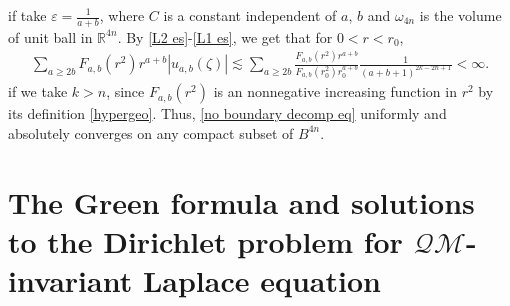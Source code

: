 \documentclass[a4paper,11pt]{amsart}
\numberwithin{equation}{section}
\begin{document}
if take $\varepsilon= \frac{1}{a+b}$, where $C$ is a constant independent of $a$, $b$ and $\omega_{4n}$ is the volume of unit ball in $\mathbb{R}^{4n}$.
By \eqref{L2 es}-\eqref{L1 es}, we get that for $0<r<r_0$,
\begin{equation}\begin{aligned}
\sum_{a\geq 2b}F_{a,b}(r^2)r^{a+b}|u_{a,b}(\zeta)|\lesssim\sum_{a\geq 2b}\frac{F_{a,b}(r^2)r^{a+b}}{F_{a,b}(r_0^2)r_0^{a+b}}\frac{1}{(a+b+1)^{2k-2n+1}}<\infty.
\end{aligned}\end{equation}
if we take $k>n$, since $F_{a,b}(r^2)$ is an nonnegative increasing function in $r^2$ by its definition \eqref{hypergeo}. Thus, \eqref{no boundary decomp eq} uniformly and absolutely converges on any compact subset of $B^{4n}$.










\section{The Green formula and solutions to the Dirichlet problem for $\mathcal{QM}$-invariant Laplace equation}
\end{document}
